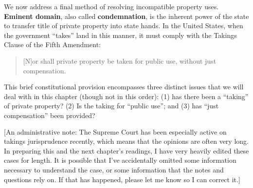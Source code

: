 We now address a final method of resolving incompatible property uses.
\textbf{Eminent domain}, also called \textbf{condemnation},
is the inherent power of the state to transfer title of
private property into state hands. In the United States, when the government
``takes'' land in this manner, it must comply with the Takings Clause of the
Fifth Amendment:
\begin{quote}
[N]or shall private property be taken for public use, without just compensation.
\end{quote}
This
brief constitutional provision encompasses three distinct issues that we will
deal with in this chapter (though not in this order): (1) has there been a
``taking'' of private property? (2) Is the taking for ``public use''; and (3)
has ``just compensation'' been provided?

[An administrative note: The Supreme Court has been especially active on takings
jurisprudence recently, which means that the opinions are often very long. In
preparing this and the next chapter's readings, I have very heavily edited these
cases for length. It is possible that I've accidentally omitted some information
necessary to understand the case, or some information that the notes and
questions rely on. If that has happened, please let me know so I can correct
it.]
